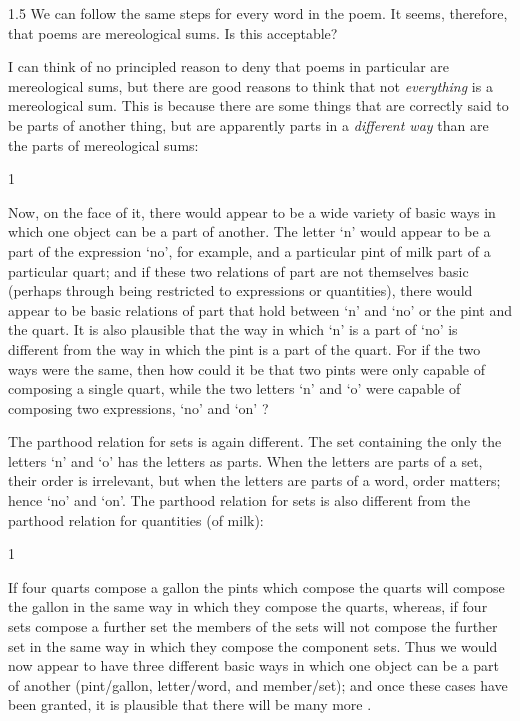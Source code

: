 \documentclass[11pt]{article}
\newenvironment{squote}{%
\begin{spacing}{1}
\begin{list}{}{%
\setlength{\labelwidth}{0pt}%
\rightmargin\leftmargin%
}
\item\relax
}{%
\end{list}%
\end{spacing}
}
\begin{document}
\begin{spacing}{1.5}
We can follow the same steps for every word in the poem.  It seems,
therefore, that poems are mereological sums.  Is this acceptable?

I can think of no principled reason to deny that poems in particular
are mereological sums, but there are good reasons to think that not
{\em everything} is a mereological sum.  This is because there are
some things that are correctly said to be parts of another thing, but
are apparently parts in a {\em different way} than are the parts of
mereological sums:

\begin{squote}
Now, on the face of it, there would appear to be a wide variety of
basic ways in which one object can be a part of another.  The letter
`n' would appear to be a part of the expression `no', for example, and
a particular pint of milk part of a particular quart; and if these two
relations of part are not themselves basic (perhaps through being
restricted to expressions or quantities), there would appear to be
basic relations of part that hold between `n' and `no' or the pint and
the quart.  It is also plausible that the way in which `n' is a part
of `no' is different from the way in which the pint is a part of the
quart.  For if the two ways were the same, then how could it be that
two pints were only capable of composing a single quart, while the two
letters `n' and `o' were capable of composing two expressions, `no'
and `on' \citep[562]{fine2010}?
\end{squote}

The parthood relation for sets is again different.  The set containing
the only the letters `n' and `o' has the letters as parts.  When the
letters are parts of a set, their order is irrelevant, but when the
letters are parts of a word, order matters; hence `no' and `on'.  The
parthood relation for sets is also different from the parthood
relation for quantities (of milk):

\begin{squote}
If four quarts compose a gallon the pints which compose the quarts
will compose the gallon in the same way in which they compose the
quarts, whereas, if four sets compose a further set the members of the
sets will not compose the further set in the same way in which they
compose the component sets.  Thus we would now appear to have three
different basic ways in which one object can be a part of another
(pint/gallon, letter/word, and member/set); and once these cases have
been granted, it is plausible that there will be many more
\citep[562]{fine2010}.
\end{squote}


\end{spacing}
\end{document}
